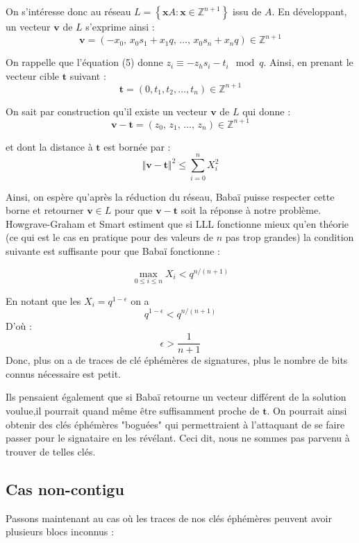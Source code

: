 \documentclass{backend}
\begin{document}
On s'intéresse donc au réseau $L=\left\{\mathbf{x} A: \mathbf{x} \in \mathbb{Z}^{n+1}\right\}$ issu de $A$. 
En développant, un vecteur $\mathbf{v}$ de $L$ s'exprime ainsi :
$$
\mathbf{v} = (-x_0 ,\, x_0s_1 + x_1q, \, \ldots, \, x_0s_n +x_nq)\in \mathbb{Z}^{n+1}
$$

On rappelle que l'équation (5) donne $z_i \equiv -z_hs_i - t_i \mod q $.
Ainsi, en prenant le vecteur cible $\mathbf{t}$ suivant :
$$
\mathbf{t}=\left(0, t_{1}, t_{2}, \ldots, t_{n}\right) \in \mathbb{Z}^{n+1}
$$

On sait par construction qu'il existe un vecteur $\mathbf{v}$ de $L$ qui donne :
$$
\mathbf{v} - \mathbf{t} = (z_0,\, z_1,\, \ldots,\, z_n) \in \mathbb{Z}^{n+1}
$$

et dont la distance à $\mathbf{t}$ est bornée par :
$$
\Vert \mathbf{v} - \mathbf{t} \Vert^2 \leq \sum_{i=0}^{n} X_i^2
$$ 


Ainsi, on espère qu'après la réduction du réseau, Babaï puisse respecter cette borne et retourner $\mathbf{v} \in L$  pour que $\mathbf{v} - \mathbf{t}$ soit la réponse à notre problème.\medbreak
Howgrave-Graham et Smart estiment que si LLL fonctionne mieux qu'en théorie (ce qui est le cas en pratique pour des valeurs de $n$ pas trop grandes) la condition suivante est suffisante pour que Babaï fonctionne :

$$
\max\limits_{0 \leq i \leq n} X_i < q^{n/(n+1)}
$$ 

En notant que les $X_i = q^{1-\epsilon}$ on a 
$$
q^{1-\epsilon} < q^{n/(n+1)}
$$
D'où :
$$
\epsilon > \frac{1}{n+1}
$$
Donc, plus on a de traces de clé éphémères de signatures, plus le nombre de bits connus nécessaire est petit.

 Ils pensaient également que si Babaï retourne un vecteur différent de la solution voulue,il pourrait quand même être suffisamment proche de $\mathbf{t}$. On pourrait ainsi obtenir des clés éphémères "boguées" qui permettraient à l'attaquant de se faire passer pour le signataire en les révélant. Ceci dit, nous ne sommes pas parvenu à trouver de telles clés.




\subsection{Cas non-contigu}

Passons maintenant au cas où les traces de nos clés éphémères peuvent avoir plusieurs blocs inconnus :

\begin{center}
\end{center}
\end{document}
